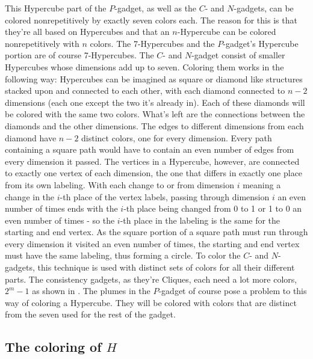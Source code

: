 \documentclass[12pt,a4paper]{article}
\begin{document}
\newline
%
This Hypercube part of the $P$-gadget, as well as the $C$- and $N$-gadgets, can be colored nonrepetitively by exactly seven colors each. The reason for this is that they're all based on Hypercubes and that an $n$-Hypercube can be colored nonrepetitively with $n$ colors. The 7-Hypercubes and the $P$-gadget's Hypercube portion are of course 7-Hypercubes. The $C$- and $N$-gadget consist of smaller Hypercubes whose dimensions add up to seven. Coloring them works in the following way: Hypercubes can be imagined as square or diamond like structures stacked upon and connected to each other, with each diamond connected to $n-2$ dimensions (each one except the two it's already in). Each of these diamonds will be colored with the same two colors. What's left are the connections between the diamonds and the other dimensions. The edges to different dimensions from each diamond have $n-2$ distinct colors, one for every dimension. Every path containing a square path would have to contain an even number of edges from every dimension it passed. The vertices in a Hypercube, however, are connected to exactly one vertex of each dimension, the one that differs in exactly one place from its own labeling. With each change to or from dimension $i$ meaning a change in the $i$-th place of the vertex labels, passing through dimension $i$ an even number of times ends with the $i$-th place being changed from 0 to 1 or 1 to 0 an even number of times - so the $i$-th place in the labeling is the same for the starting and end vertex. As the square portion of a square path must run through every dimension it visited an even number of times, the starting and end vertex must have the same labeling, thus forming a circle. 
\newline
To color the $C$- and $N$-gadgets, this technique is used with distinct sets of colors for all their different parts. The consistency gadgets, as they're Cliques, each need a lot more colors, $2^m-1$ as shown in \citep{Alon2002}.
\newline
The plumes in the $P$-gadget of course pose a problem to this way of coloring a Hypercube. They will be colored with colors that are distinct from the seven used for the rest of the gadget.

\subsection{The coloring of $H$}
\end{document}
